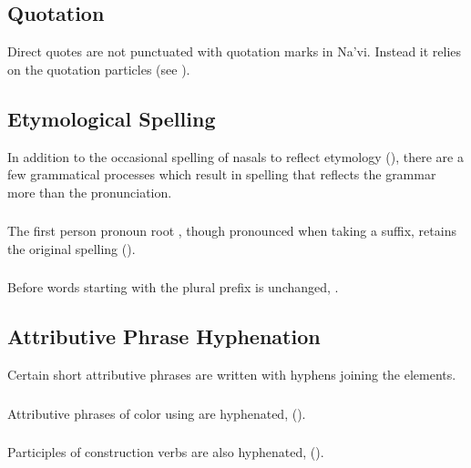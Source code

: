 \subsection{Quotation} Direct quotes are not punctuated with quotation
marks in Na'vi.  Instead it relies on the quotation particles
 (see ).

\subsection{Etymological Spelling} In addition to the occasional
spelling of nasals to reflect etymo\-logy (),
there are a few grammatical processes which result in spelling that
reflects the grammar more than the pronunciation.

\subsubsection{} The first person pronoun root , though
pronounced  when taking a suffix, retains the original spelling
().

\subsubsection{} Before words starting with  the plural prefix
 is unchanged, .

\subsection{Attributive Phrase Hyphenation} Certain short attributive
phrases are written with hy\-phens joining the elements.

\subsubsection{} Attributive phrases of color using  
are hyphenated,   ().

\subsubsection{} Participles of  construction verbs are also
hyphenated,  
().

